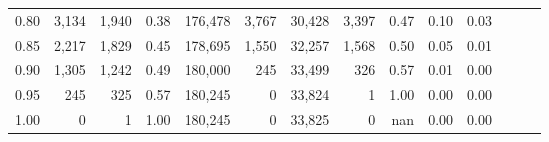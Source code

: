 \begin{tabular}{rrrrrrrrrrrrrr}
0.80 &   3,134 &  1,940 &  0.38 &  176,478 &    3,767 &  30,428 &   3,397 &  0.47 &  0.10 &      0.03 \\
0.85 &   2,217 &  1,829 &  0.45 &  178,695 &    1,550 &  32,257 &   1,568 &  0.50 &  0.05 &      0.01 \\
0.90 &   1,305 &  1,242 &  0.49 &  180,000 &      245 &  33,499 &     326 &  0.57 &  0.01 &      0.00 \\
0.95 &     245 &    325 &  0.57 &  180,245 &        0 &  33,824 &       1 &  1.00 &  0.00 &      0.00 \\
1.00 &       0 &      1 &  1.00 &  180,245 &        0 &  33,825 &       0 &   nan &  0.00 &      0.00 \\
\bottomrule
\end{tabular}
